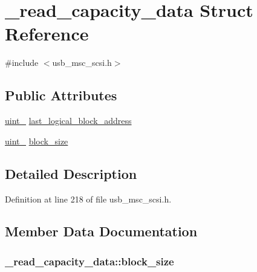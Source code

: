 \hypertarget{struct__read__capacity__data}{}\section{\+\_\+read\+\_\+capacity\+\_\+data Struct Reference}
\label{struct__read__capacity__data}


{\ttfamily \#include $<$usb\+\_\+msc\+\_\+scsi.\+h$>$}

\subsection*{Public Attributes}
\begin{DoxyCompactItemize}
\item 
\hyperlink{types_8h_a5532400b872b4aa84e54335bf458a318}{uint\+\_} \hyperlink{struct__read__capacity__data_aa5e87b0e8737d138a448ceb378142c9f}{last\+\_\+logical\+\_\+block\+\_\+address}
\item 
\hyperlink{types_8h_a5532400b872b4aa84e54335bf458a318}{uint\+\_} \hyperlink{struct__read__capacity__data_ae0cb2f7d0b8d79e3be043f16accfa576}{block\+\_\+size}
\end{DoxyCompactItemize}


\subsection{Detailed Description}


Definition at line 218 of file usb\+\_\+msc\+\_\+scsi.\+h.



\subsection{Member Data Documentation}
\subsubsection[{\texorpdfstring{block\+\_\+size}{block_size}}]{ \+\_\+read\+\_\+capacity\+\_\+data\+::block\+\_\+size}\hypertarget{struct__read__capacity__data_ae0cb2f7d0b8d79e3be043f16accfa576}{}\label{struct__read__capacity__data_ae0cb2f7d0b8d79e3be043f16accfa576}


